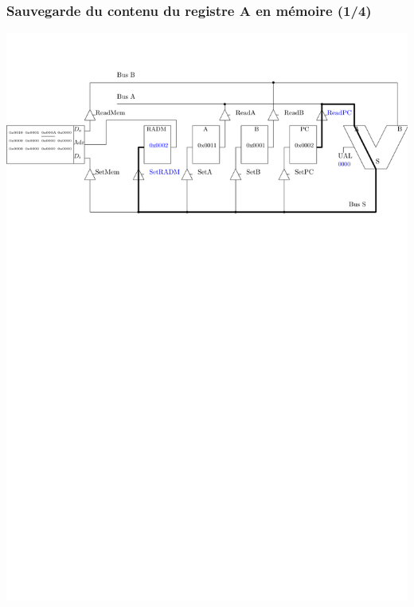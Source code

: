\documentclass{beamer}
\begin{document}
\begin{frame}
\frametitle{Sauvegarde du contenu du registre A en mémoire (1/4)}
\includegraphics[width=\linewidth]{Figs/premier_chemin_sta1.pdf}
\end{frame}
\end{document}
